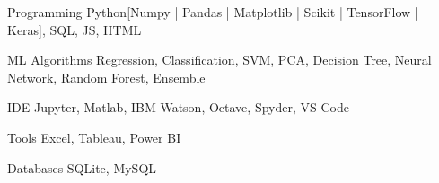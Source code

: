 


\begin{cvskills}


\cvskill
{Programming} %
{Python[Numpy | Pandas | Matplotlib | Scikit | TensorFlow | Keras], SQL, JS, HTML} %


\cvskill
{ML Algorithms} %
{Regression, Classification, SVM, PCA, Decision Tree, Neural Network, Random Forest, Ensemble } %


\cvskill
{IDE} %
{Jupyter, Matlab, IBM Watson, Octave, Spyder, VS Code} %



\cvskill
{Tools} %
{Excel, Tableau, Power BI} %

\cvskill
{Databases} %
{SQLite, MySQL} %

\end{cvskills}
